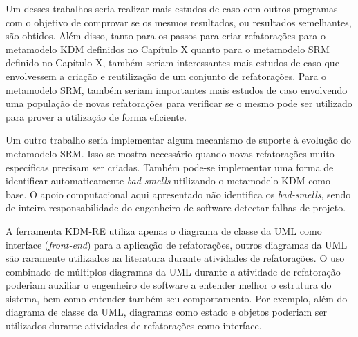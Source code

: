 Um desses trabalhos seria realizar mais estudos de caso com outros programas com o objetivo de comprovar se os mesmos resultados, ou resultados semelhantes, são obtidos. Além disso, tanto para os passos para criar refatorações para o metamodelo KDM definidos no Capítulo X quanto para o metamodelo SRM definido no Capítulo X, também seriam interessantes mais estudos de caso que envolvessem a criação e reutilização de um conjunto de refatorações. Para o metamodelo SRM, também seriam importantes mais estudos de caso envolvendo uma população de novas refatorações para verificar se o mesmo pode ser utilizado para prover a utilização de forma eficiente. 

Um outro trabalho seria implementar algum mecanismo de suporte à evolução do metamodelo SRM. Isso se mostra necessário quando novas refatorações muito específicas precisam ser criadas. Também pode-se implementar uma forma de identificar automaticamente \textit{bad-smells} utilizando o metamodelo KDM como base. O apoio computacional aqui apresentado não identifica os \textit{bad-smells}, sendo de inteira responsabilidade do engenheiro de software detectar falhas de projeto.


A ferramenta KDM-RE utiliza apenas o diagrama de classe da UML como interface (\textit{front-end}) para a aplicação de refatorações, outros diagramas da UML são raramente utilizados na literatura durante atividades de refatorações. O uso combinado de múltiplos diagramas da UML durante a atividade de refatoração poderiam auxiliar o engenheiro de software a entender melhor o estrutura do sistema, bem como entender também seu comportamento. Por exemplo, além do diagrama de classe da UML, diagramas como estado e objetos poderiam ser utilizados durante atividades de refatorações como interface. 

